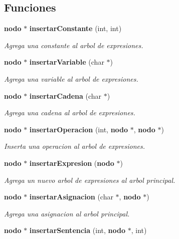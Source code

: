 \subsection*{Funciones}
\begin{CompactItemize}
\item 
{\bf nodo} $\ast$ {\bf insertar\-Constante} (int, int)
\begin{CompactList}\small\item\em Agrega una constante al arbol de expresiones. \item\end{CompactList}\item 
{\bf nodo} $\ast$ {\bf insertar\-Variable} (char $\ast$)
\begin{CompactList}\small\item\em Agrega una variable al arbol de expresiones. \item\end{CompactList}\item 
{\bf nodo} $\ast$ {\bf insertar\-Cadena} (char $\ast$)
\begin{CompactList}\small\item\em Agrega una cadena al arbol de expresiones. \item\end{CompactList}\item 
{\bf nodo} $\ast$ {\bf insertar\-Operacion} (int, {\bf nodo} $\ast$, {\bf nodo} $\ast$)
\begin{CompactList}\small\item\em Inserta una operacion al arbol de expresiones. \item\end{CompactList}\item 
{\bf nodo} $\ast$ {\bf insertar\-Expresion} ({\bf nodo} $\ast$)
\begin{CompactList}\small\item\em Agrega un nuevo arbol de expresiones al arbol principal. \item\end{CompactList}\item 
{\bf nodo} $\ast$ {\bf insertar\-Asignacion} (char $\ast$, {\bf nodo} $\ast$)
\begin{CompactList}\small\item\em Agrega una asignacion al arbol principal. \item\end{CompactList}\item 
{\bf nodo} $\ast$ {\bf insertar\-Sentencia} (int, {\bf nodo} $\ast$, int)

\end{CompactItemize}
